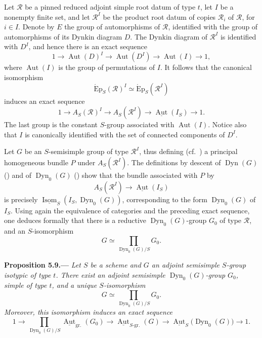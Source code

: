 Let \(\mathscr R\) be a pinned reduced adjoint simple root datum of type
\(t\), let \(I\) be a nonempty finite set, and let
\(\mathscr R^I\) be the product root datum of copies
\(\mathscr R_i\) of \(\mathscr R\), for \(i\in I\).  Denote by \(E\)
the group of automorphisms of \(\mathscr R\), identified with the group
of automorphisms of its Dynkin diagram \(D\).  The Dynkin diagram of
\(\mathscr R^I\) is identified with \(D^I\), and hence there is an
exact sequence
\[
  1\longrightarrow\operatorname{Aut}(D)^I
  \longrightarrow\operatorname{Aut}(D^I)
  \longrightarrow\operatorname{Aut}(I)
  \longrightarrow1,
\]
where \(\operatorname{Aut}(I)\) is the group of permutations of \(I\).
It follows that the canonical isomorphism
\[
  \operatorname{\acute Ep}_S(\mathscr R)^I
  \simeq
  \operatorname{\acute Ep}_S(\mathscr R^I)
\]
induces an exact sequence
\[
  1\longrightarrow A_S(\mathscr R)^I
  \longrightarrow A_S(\mathscr R^I)
  \longrightarrow\underline{\operatorname{Aut}}(I_S)
  \longrightarrow1.
\]
The last group is the constant \(S\)-group associated with
\(\operatorname{Aut}(I)\).  Notice also that \(I\) is canonically
identified with the set of connected components of \(D^I\).

Let \(G\) be an \(S\)-semisimple group of type \(\mathscr R^I\), thus
defining (cf.\ ) a principal homogeneous bundle \(P\) under
\(A_S(\mathscr R^I)\).  The definitions by descent of
\(\operatorname{Dyn}(G)\) () and of
\(\operatorname{Dyn}_0(G)\) () show that the bundle associated with
\(P\) by
\[
  A_S(\mathscr R^I)\longrightarrow
  \underline{\operatorname{Aut}}(I_S)
\]
is precisely
\(\underline{\operatorname{Isom}}_S(I_S,\operatorname{Dyn}_0(G))\),
corresponding to the form \(\operatorname{Dyn}_0(G)\) of \(I_S\).
Using again the equivalence of categories  and the preceding exact
sequence, one deduces formally that there is a reductive
\(\operatorname{Dyn}_0(G)\)-group \(G_0\) of type \(\mathscr R\), and
an \(S\)-isomorphism
\[
  G\simeq\prod_{\operatorname{Dyn}_0(G)/S}G_0.
\]

\par\medskip\noindent{}\textbf{Proposition 5.9.---}\enspace
\emph{Let \(S\) be a scheme and \(G\) an adjoint semisimple
\(S\)-group isotypic of type \(t\).  There exist an adjoint semisimple
\(\operatorname{Dyn}_0(G)\)-group \(G_0\), simple of type \(t\), and a
unique \(S\)-isomorphism}
\[
  G\simeq\prod_{\operatorname{Dyn}_0(G)/S}G_0.
\]
\emph{Moreover, this isomorphism induces an exact sequence}
\[
  1\longrightarrow
  \prod_{\operatorname{Dyn}_0(G)/S}
    \underline{\operatorname{Aut}}_{\mathrm{gr.}}(G_0)
  \longrightarrow
  \underline{\operatorname{Aut}}_{S\text{-}\mathrm{gr.}}(G)
  \longrightarrow
  \underline{\operatorname{Aut}}_S\bigl(\operatorname{Dyn}_0(G)\bigr)
  \longrightarrow1.
\]

